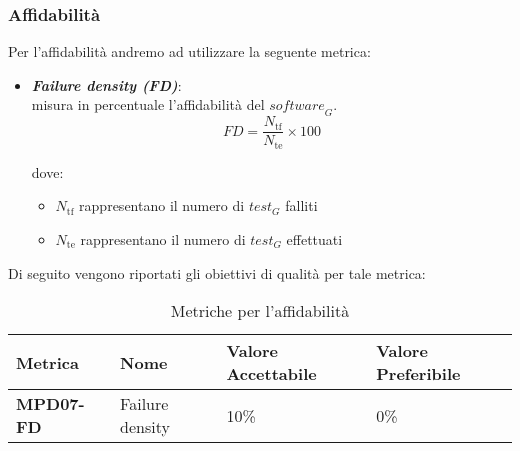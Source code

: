 \subsubsection{Affidabilità}
Per l'affidabilità andremo ad utilizzare la seguente metrica:
\begin{itemize}
    \item \textbf{\emph{Failure density (FD)}}:\\
    misura in percentuale l'affidabilità del $\textit{software}_G$.
    \[
    FD = \frac{N_{\text{tf}}}{N_{\text{te}}} \times 100
    \]

    dove:
    \begin{itemize}
        \item \(N_{\text{tf}}\) rappresentano il numero di $\textit{test}_G$ falliti
        \item \(N_{\text{te}}\) rappresentano il numero di $\textit{test}_G$ effettuati
    \end{itemize}
\end{itemize}
Di seguito vengono riportati gli obiettivi di qualità per tale metrica:
\begin{table}[htbp]
    \centering
    \begin{tabular}{|>{\centering\arraybackslash}p{4cm}|p{4cm}|p{4cm}|p{4cm}|}
    \hline
    \rowcolor{gray!30}
    \textbf{Metrica} & \textbf{Nome} & \textbf{Valore Accettabile} & \textbf{Valore Preferibile} \\
    \hline
    \rowcolor{gray!10}
    \textbf{MPD07-FD} & Failure density & 10\% & 0\% \\
    \hline
    \end{tabular}
    \caption{Metriche per l'affidabilità}
    \label{tab:metriche_affidabilita}
\end{table}

\begin{comment}
\subsubsection{Sicurezza}
Per la sicurezza andremo ad utilizzare le seguenti metriche
\end{comment}

